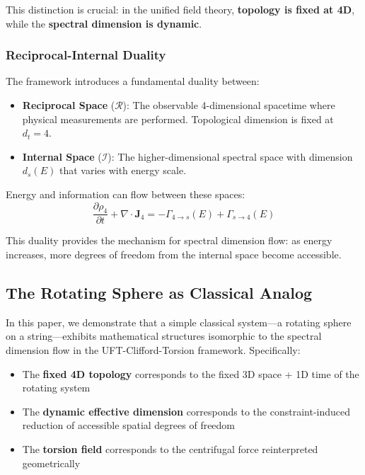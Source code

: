 \documentclass[12pt,a4paper]{article}
\begin{document}
This distinction is crucial: in the unified field theory, \textbf{topology is fixed at 4D}, while the \textbf{spectral dimension is dynamic}.

\subsubsection{Reciprocal-Internal Duality}

The framework introduces a fundamental duality between:
\begin{itemize}
    \item \textbf{Reciprocal Space} ($\mathcal{R}$): The observable 4-dimensional spacetime where physical measurements are performed. Topological dimension is fixed at $d_t = 4$.
    \item \textbf{Internal Space} ($\mathcal{I}$): The higher-dimensional spectral space with dimension $d_s(E)$ that varies with energy scale.
\end{itemize}

Energy and information can flow between these spaces:
\begin{equation}
    \frac{\partial \rho_4}{\partial t} + \nabla \cdot \mathbf{J}_4 = -\Gamma_{4 \to s}(E) + \Gamma_{s \to 4}(E)
\end{equation}

This duality provides the mechanism for spectral dimension flow: as energy increases, more degrees of freedom from the internal space become accessible.

\subsection{The Rotating Sphere as Classical Analog}

In this paper, we demonstrate that a simple classical system---a rotating sphere on a string---exhibits mathematical structures isomorphic to the spectral dimension flow in the UFT-Clifford-Torsion framework. Specifically:

\begin{itemize}
    \item The \textbf{fixed 4D topology} corresponds to the fixed 3D space + 1D time of the rotating system
    \item The \textbf{dynamic effective dimension} corresponds to the constraint-induced reduction of accessible spatial degrees of freedom
    \item The \textbf{torsion field} corresponds to the centrifugal force reinterpreted geometrically
\end{itemize}
\end{document}
